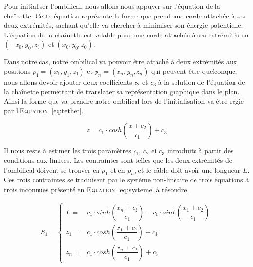 				Pour initialiser l'ombilical, nous allons nous appuyer sur l'équation de la chaînette. Cette équation représente la forme que prend une corde attachée à ses deux extrémités, sachant qu'elle va chercher à minimiser son énergie potentielle. L'équation de la chaînette est valable pour une corde attachée à ses extrémités en $(-x_0, y_0, z_0)$ et $(x_0, y_0, z_0)$.
				
				Dans notre cas, notre ombilical va pouvoir être attaché à deux extrémités aux positions $p_1 = (x_1, y_1, z_1)$ et $p_n = (x_n, y_n, z_n)$ qui peuvent être quelconque, nous allons devoir ajouter deux coefficients $c_2$ et $c_3$ à la solution de l'équation de la chaînette permettant de translater sa représentation graphique dans le plan. Ainsi la forme que va prendre notre ombilical lors de l'initialisation va être régie par l'\textsc{Equation}~\ref{eq:tether}.
			
				\begin{equation}
					z = c_1\cdot cosh\left(\frac{x + c_2}{c_1}\right) + c_3
					\label{eq:tether}
				\end{equation}
			
				Il nous reste à estimer les trois paramètres $c_1$, $c_2$ et $c_3$ introduits à partir des conditions aux limites. Les contraintes sont telles que les deux extrémités de l'ombilical doivent se trouver en $p_1$ et en $p_n$, et le câble doit avoir une longueur $L$. Ces trois contraintes se traduisent par le système non-linéaire de trois équations à trois inconnues présenté en \textsc{Equation}~\ref{eq:systeme} à résoudre.
				
				\begin{align}
					S_1 = 
					\begin{cases}
						L   = & c_1 \cdot sinh\left(\dfrac{x_n+c_2}{c_1}\right) - c_1 \cdot sinh\left(\dfrac{x_1+c_2}{c_1}\right) \\
						z_1 = & c_1 \cdot cosh\left(\dfrac{x_1+c_2}{c_1}\right)+c_3 \\
						z_n = & c_1 \cdot cosh\left(\dfrac{x_n+c_2}{c_1}\right)+c_3
					\end{cases}
					\label{eq:systeme}
				\end{align}
			
